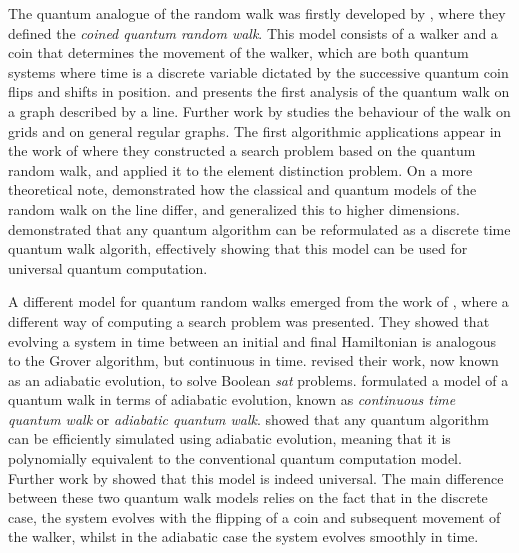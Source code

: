 \documentclass[../../dissertation.tex]{subfiles}
\begin{document}
The quantum analogue of the random walk was firstly developed by
\cite{aharonov1993}, where they defined the \textit{coined quantum random
walk}.  This model consists of a walker and a coin that determines the movement
of the walker, which are both quantum systems where time is a discrete variable
dictated by the successive quantum coin flips and shifts in position.
\cite{nayak2000} and \cite{aharonov2002}  presents the first analysis of the
quantum walk on a graph described by a line. Further work by \cite{inui2003}
studies the behaviour of the walk on grids and \cite{aharonov2002} on general
regular graphs. The first algorithmic applications appear in the work of
\cite{shenvi2002} where they constructed a search problem based on the quantum
random walk, and \cite{ambainis2003} applied it to the element distinction
problem. On a more theoretical note, \cite{konno2002} demonstrated how the
classical and quantum models of the random walk on the line differ, and
\cite{grimmett2003} generalized this to higher dimensions. \cite{lovett2010} demonstrated
that any quantum algorithm can be reformulated as a discrete time quantum walk
algorith, effectively showing that this model can be used for universal quantum
computation.\par

A different model for quantum random walks emerged from the work of
\cite{farhi1996}, where a different way of computing a search problem was
presented. They showed that evolving a system in time between an initial and
final Hamiltonian is analogous to the Grover algorithm, but continuous in time.
\cite{farhi2000} revised their work, now known as an adiabatic evolution, to
solve Boolean \textit{sat} problems. \cite{childs2004} formulated a model of a
quantum walk in terms of adiabatic evolution, known as \textit{continuous time
quantum walk} or \textit{adiabatic quantum walk}. \cite{aharonov2005} showed
that any quantum algorithm can be efficiently simulated using adiabatic
evolution, meaning that it is polynomially equivalent to the conventional
quantum computation model. Further work by \cite{childs2009} showed that this
model is indeed universal. The main difference between these two quantum walk
models relies on the fact that in the discrete case, the system evolves with
the flipping of a coin and subsequent movement of the walker, whilst in the
adiabatic case the system evolves smoothly in time.\par 
\end{document}
